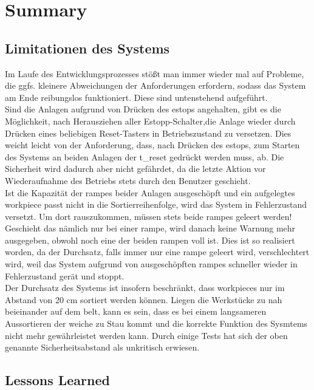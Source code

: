 \chapter{Summary}\label{ch:summary}


\section{Limitationen des Systems}\label{sec:limitations}

Im Laufe des Entwicklungsprozesses stößt man immer wieder mal auf Probleme, die ggfs. kleinere Abweichungen der
Anforderungen erfordern, sodass das System am Ende reibungslos funktioniert. Diese sind untenstehend aufgeführt.\\

Sind die Anlagen aufgrund von Drücken des \gls{estop}s angehalten, gibt es die Möglichkeit, nach Herausziehen aller
Estopp-Schalter,die Anlage wieder durch Drücken eines beliebigen Reset-Tasters in Betriebszustand zu versetzen. Dies weicht leicht
von der Anforderung, dass, nach Drücken des \gls{estop}s, zum Starten des Systems an beiden Anlagen der \gls{t_reset} gedrückt
werden muss, ab. Die Sicherheit wird dadurch aber nicht gefährdet, da die letzte Aktion vor Wiederaufnahme des Betriebs
stets durch den Benutzer geschieht.\\

Ist die Kapazität der \glspl{rampe} beider Anlagen ausgeschöpft und ein aufgelegtes \gls{workpiece} passt nicht in die
Sortierreihenfolge, wird das System in Fehlerzustand versetzt. Um dort rauszukommen, müssen stets beide \glspl{rampe} geleert
werden! Geschieht das nämlich nur bei einer \gls{rampe}, wird danach keine Warnung mehr ausgegeben, obwohl noch eine der
beiden \gls{rampe}n voll ist. Dies ist so realisiert worden, da der Durchsatz, falls immer nur eine \gls{rampe} geleert wird,
verschlechtert wird, weil das System aufgrund von ausgeschöpften \glspl{rampe} schneller wieder in Fehlerzustand gerät und
stoppt.\\

Der Durchsatz des Systems ist insofern beschränkt, dass \glspl{workpiece} nur im Abstand von 20 cm sortiert werden können.
Liegen die Werkstücke zu nah beieinander auf dem \gls{belt}, kann es sein, dass es bei einem langsameren Aussortieren
der \gls{weiche} zu Stau kommt und die korrekte Funktion des Sysmtems nicht mehr gewährleistet werden kann.
Durch einige Tests hat sich der oben genannte Sicherheitsabstand als unkritisch erwiesen.

\section{Lessons Learned}\label{sec:lessons-learned}